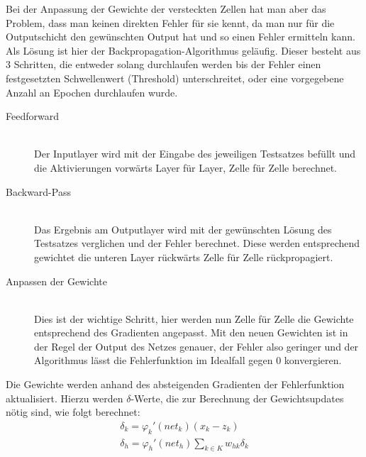 Bei der Anpassung der Gewichte der versteckten Zellen hat man aber das Problem, dass man keinen direkten Fehler für sie kennt, da man nur für die Outputschicht den gewünschten Output hat und so einen Fehler ermitteln kann. Als Lösung ist hier der Backpropagation-Algorithmus geläufig. Dieser besteht aus 3 Schritten, die entweder solang durchlaufen werden bis der Fehler einen festgesetzten Schwellenwert (Threshold) unterschreitet, oder eine vorgegebene Anzahl an Epochen durchlaufen wurde. 
\begin{description}	\item[Feedforward]\hfill \\
	Der Inputlayer wird mit der Eingabe des jeweiligen Testsatzes befüllt und die Aktivierungen vorwärts Layer für Layer, Zelle für Zelle berechnet.  
	\item[Backward-Pass]\hfill \\ 
	Das Ergebnis am Outputlayer wird mit der gewünschten Lösung des Testsatzes verglichen und der Fehler berechnet. Diese werden entsprechend gewichtet die unteren Layer rückwärts Zelle für Zelle rückpropagiert.
	\item[Anpassen der Gewichte]\hfill \\ Dies ist der wichtige Schritt, hier werden nun Zelle für Zelle die Gewichte entsprechend des Gradienten angepasst. Mit den neuen Gewichten ist in der Regel der Output des Netzes genauer, der Fehler also geringer und der Algorithmus lässt die Fehlerfunktion im Idealfall gegen 0 konvergieren. \cite{bib:aneuron}
\end{description}
Die Gewichte werden anhand des absteigenden Gradienten der Fehlerfunktion aktualisiert.  Hierzu werden \(\delta\)-Werte, die zur Berechnung der Gewichtsupdates nötig sind, wie folgt berechnet: 
\begin{gather}
\delta_{k} = \varphi_{k}'(net_{k})(x_{k}-z_{k}) \\
\delta_{h} = \varphi_{h}'(net_{h})\sum_{k\in K}w_{hk}\delta_{k} 
\label{eq:err}
\end{gather}

